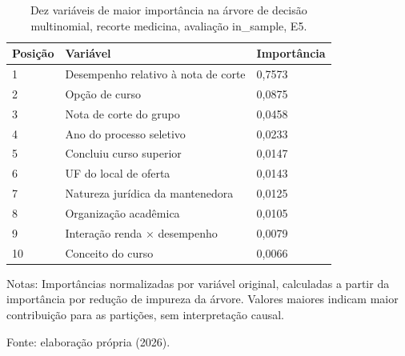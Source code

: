 \begin{table}[htbp]
\centering
\caption{Dez variáveis de maior importância na árvore de decisão multinomial, recorte medicina, avaliação in\_sample, E5.}
\label{tab:top10_importancias_treeClassification_19_ternario_medicina_in_sample}
\small
\begin{tabular}{lll}
\toprule
\rowcolor[gray]{0.85}
Posição & Variável & Importância \\
\midrule
1 & Desempenho relativo à nota de corte & 0,7573 \\
\rowcolor[gray]{0.95}
2 & Opção de curso & 0,0875 \\
3 & Nota de corte do grupo & 0,0458 \\
\rowcolor[gray]{0.95}
4 & Ano do processo seletivo & 0,0233 \\
5 & Concluiu curso superior & 0,0147 \\
\rowcolor[gray]{0.95}
6 & UF do local de oferta & 0,0143 \\
7 & Natureza jurídica da mantenedora & 0,0125 \\
\rowcolor[gray]{0.95}
8 & Organização acadêmica & 0,0105 \\
9 & Interação renda × desempenho & 0,0079 \\
\rowcolor[gray]{0.95}
10 & Conceito do curso & 0,0066 \\
\bottomrule
\end{tabular}
\par\footnotesize{Notas: Importâncias normalizadas por variável original, calculadas a partir da importância por redução de impureza da árvore. Valores maiores indicam maior contribuição para as partições, sem interpretação causal.}
\par\footnotesize{Fonte: elaboração própria (2026).}
\end{table}

